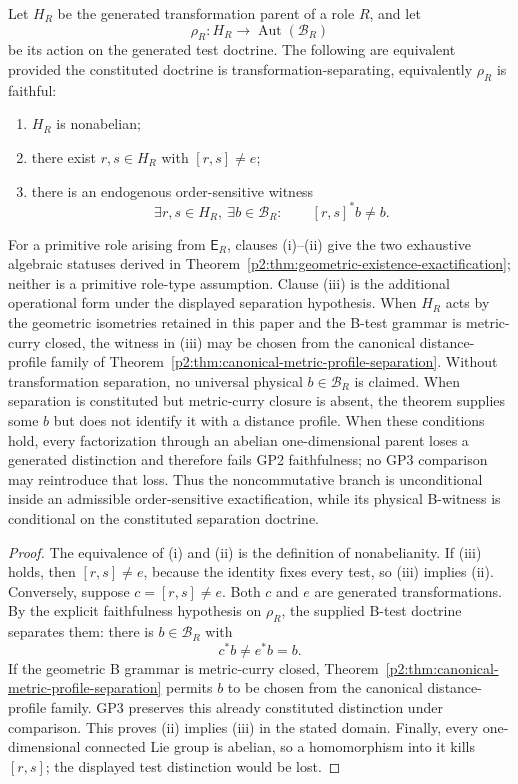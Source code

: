 \documentclass[12pt,a4paper]{article}
\begin{document}
\begin{theorem}
\label{p2:thm:gp2-commutator-dichotomy}
\label{p2:thm:gp2-generated-rank-one-obstruction}
Let \(H_R\) be the generated transformation parent of a role \(R\), and let
\[
 \rho_R:H_R\longrightarrow\operatorname{Aut}(\mathcal B_R)
\]
be its action on the generated test doctrine.  The following are equivalent
provided the constituted doctrine is transformation-separating, equivalently
\(\rho_R\) is faithful:
\begin{enumerate}[label=(\roman*), leftmargin=2em]
\item \(H_R\) is nonabelian;
\item there exist \(r,s\in H_R\) with \([r,s]\ne e\);
\item there is an endogenous order-sensitive witness
\[
 \exists r,s\in H_R,\ \exists b\in\mathcal B_R:
 \qquad [r,s]^*b\ne b.
 \]
\end{enumerate}
For a primitive role arising from \(\mathsf E_R\), clauses (i)--(ii) give the
two exhaustive algebraic statuses derived in
Theorem~\ref{p2:thm:geometric-existence-exactification}; neither is a
primitive role-type assumption.
Clause (iii) is the additional operational form under the displayed separation
hypothesis.  When \(H_R\) acts by the geometric isometries retained in this paper and the
B-test grammar is metric-curry closed, the witness in (iii) may be chosen
from the canonical distance-profile family of
Theorem~\ref{p2:thm:canonical-metric-profile-separation}.  Without
transformation separation, no universal physical \(b\in\mathcal B_R\) is
claimed.  When separation is constituted but metric-curry closure is absent,
the theorem supplies some \(b\) but does not identify it with a distance
profile.  When these conditions hold, every factorization through an abelian
one-dimensional parent loses a generated distinction and therefore fails GP2
faithfulness; no GP3 comparison may reintroduce that loss.
Thus the noncommutative branch is unconditional inside an admissible
order-sensitive exactification, while its physical B-witness is conditional on
the constituted separation doctrine.
\end{theorem}

\begin{proof}
The equivalence of (i) and (ii) is the definition of nonabelianity.  If (iii)
holds, then \([r,s]\ne e\), because the identity fixes every test, so (iii)
implies (ii).  Conversely, suppose \(c=[r,s]\ne e\).  Both \(c\) and \(e\)
are generated transformations.  By the explicit faithfulness hypothesis on
\(\rho_R\), the supplied B-test doctrine separates them: there is
\(b\in\mathcal B_R\) with
\[
        c^*b\ne e^*b=b.
\]
If the geometric B grammar is metric-curry closed,
Theorem~\ref{p2:thm:canonical-metric-profile-separation} permits \(b\) to be
chosen from the canonical distance-profile family.  GP3 preserves this
already constituted distinction under comparison.  This proves (ii)
implies (iii) in the stated domain.  Finally, every one-dimensional connected Lie
group is abelian, so a homomorphism into it kills \([r,s]\); the displayed
test distinction would be lost.
\end{proof}
\end{document}
